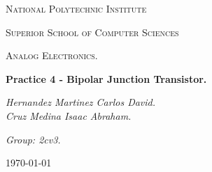 \begin{titlepage}
	\centering
	{ \huge \scshape National Polytechnic Institute\par}
	{ \Large \scshape  Superior School of Computer Sciences\par }
	\vspace{1cm}
	{\scshape\Large Analog Electronics.\par}
	\vspace{1.5cm}
	{\Huge\bfseries Practice 4 - Bipolar Junction Transistor.\par}
	\vspace{2cm}
	{\Large\itshape Hernandez Martinez Carlos David. \\ Cruz Medina Isaac Abraham. \par} \hfill \break
	{\Large\itshape Group: 2cv3. \par}
	\vfill
	{\large \today\par} 
	\vfill
\end{titlepage}


\tableofcontents 
{}
\pagebreak
